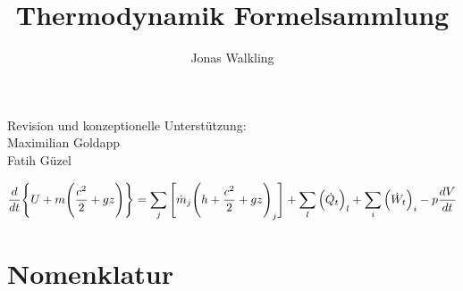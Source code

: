 \documentclass[twocolumn]{article}
\title{Thermodynamik Formelsammlung}
\author{Jonas Walkling}
\begin{document}
\onecolumn
\maketitle


\begin{center}
	Revision und konzeptionelle Unterstützung: \\
	Maximilian Goldapp \\
	Fatih Güzel \\
\end{center}


\pagebreak
\tableofcontents
\twocolumn
\pagebreak

\Large
\begin{equation*}
	\frac{d}{dt}\Bigg{\{} U + m \Bigg{(}\frac{c^2}{2}+gz\Bigg{)}\Bigg{\}} 
	= 
	\sum_{j}{\Bigg{[}\dot{m}_j\Bigg{(}h+\frac{c^2}{2}+gz\Bigg{)}_j \Bigg{]}}  
	+ 
	\sum_{l}^{} \Big(\dot{Q}_t\Big)_l 
	+ 
	\sum_{i}\Big(\dot{W}_t\Big)_i
	-
	p\frac{dV}{dt}
\end{equation*}

\normalsize


\section{Nomenklatur}
\end{document}
